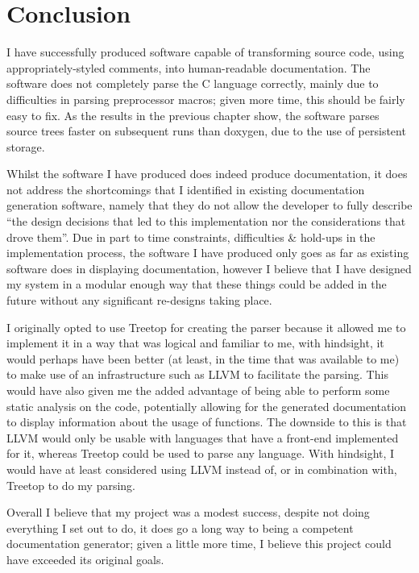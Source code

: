 
\chapter{Conclusion}
I have successfully produced software capable of transforming source code, using
appropriately-styled comments, into human-readable documentation. The software
does not completely parse the C language correctly, mainly due to difficulties
in parsing preprocessor macros; given more time, this should be fairly easy to
fix. As the results in the previous chapter show, the software parses source
trees faster on subsequent runs than doxygen, due to the use of persistent
storage.

Whilst the software I have produced does indeed produce documentation, it does
not address the shortcomings that I identified in existing documentation
generation software, namely that they do not allow the developer to fully
describe ``the design decisions that led to this implementation nor the
considerations that drove them''. Due in part to time constraints, difficulties
\& hold-ups in the implementation process, the software I have produced only
goes as far as existing software does in displaying documentation, however I
believe that I have designed my system in a modular enough way that these things
could be added in the future without any significant re-designs taking place.

I originally opted to use Treetop for creating the parser because it allowed me
to implement it in a way that was logical and familiar to me, with hindsight, it
would perhaps have been better (at least, in the time that was available to me)
to make use of an infrastructure such as LLVM\cite{website:llvm} to facilitate
the parsing. This would have also given me the added advantage of being able to
perform some static analysis on the code, potentially allowing for the generated
documentation to display information about the usage of functions. The downside
to this is that LLVM would only be usable with languages that have a front-end
implemented for it, whereas Treetop could be used to parse any language. With
hindsight, I would have at least considered using LLVM instead of, or in
combination with, Treetop to do my parsing.

Overall I believe that my project was a modest success, despite not doing
everything I set out to do, it does go a long way to being a competent
documentation generator; given a little more time, I believe this project could
have exceeded its original goals.
